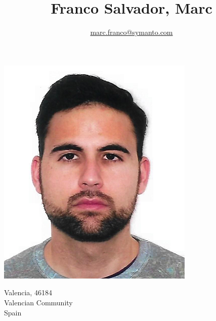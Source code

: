 \documentclass[10pt]{article}
\title{\bfseries\Huge Franco Salvador, Marc}
\author{\href{mailto:marc.franco@symanto.com}{marc.franco@symanto.com}}
\date{}
\begin{document}
\begin{minipage}{0.65\textwidth}
\begingroup
\let\center\flushleft
\let\endcenter\endflushleft
\maketitle
\endgroup
\end{minipage}
\begin{minipage}{0.3\textwidth}
\includegraphics[scale=0.3]{img/marc}
\end{minipage}

\begin{minipage}[ht]{0.48\textwidth}
Valencia, 46184\\
Valencian Community\\
Spain
\end{minipage}
\begin{minipage}[ht]{0.48\textwidth}

\end{minipage}

\vspace{2em}


\newcommand\VRule{\color{lightgray}\vrule width 0.5pt}
\end{document}
